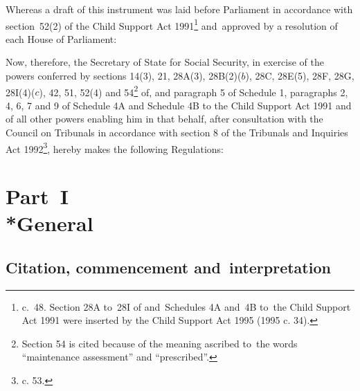 \documentclass[12pt,a4paper]{article}
\title{\regstitle}
\author{S.I.~1996 No.~2907}
\date{Made 20th November 1996\\Coming into~force 2nd December 1996}
\begin{document}
\enlargethispage{\baselineskip}

\maketitle



\medskip

\noindent
Whereas a draft of this instrument was laid before Parliament in accordance with
section~52(2) of the Child Support Act 1991\footnote{ c.~48.
Section 28A to~28I of and~Schedules 4A and~4B to~the Child Support Act 1991 were
inserted by the Child Support Act 1995 (1995 c. 34).} and~approved by a
resolution of each House of Parliament:

Now, therefore, the Secretary of State for Social Security, in exercise of the
powers conferred by sections 14(3), 21, 28A(3), 28B(2)($b$), 28C, 28E(5), 28F,
28G, 28I(4)($c$), 42, 51, 52(4) and 54\footnote{\frenchspacing Section 54 is cited
because of the meaning ascribed to~the words “maintenance assessment” and
“prescribed”.} of, and paragraph 5 of Schedule 1, paragraphs 2, 4, 6, 7 and 9 of
Schedule 4A and Schedule 4B to the Child Support Act 1991 and of all other
powers enabling him in that behalf, after consultation with the Council on
Tribunals in accordance with section 8 of the Tribunals and Inquiries Act
1992\footnote{ c. 53.}, hereby makes the following
Regulations:

{\sloppy

\tableofcontents

}

\setcounter{secnumdepth}{-2}

\section[Part~I --- General]{Part~I\\*General}

\subsection[1. Citation, commencement and~interpretation]{Citation, commencement and~interpretation}
\end{document}
